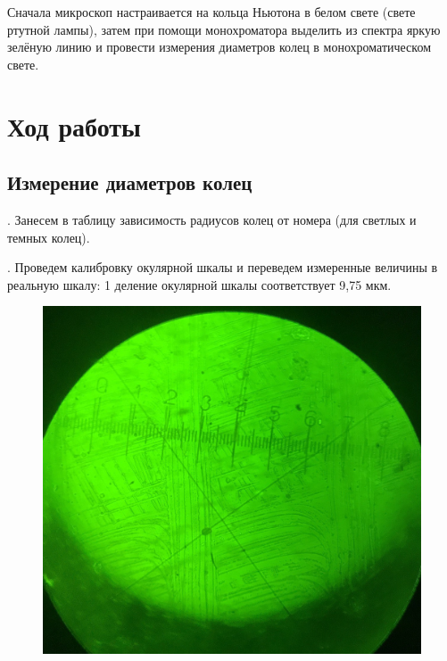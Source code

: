 \documentclass[a4paper,12pt]{article} %
\begin{document}
\medskip

\noindent Сначала микроскоп настраивается на кольца Ньютона в белом свете (свете ртутной лампы), затем при помощи монохроматора выделить из спектра яркую зелёную линию и провести измерения диаметров колец в монохроматическом свете. 
	

\section{Ход работы}

\subsection{Измерение диаметров колец}

. Занесем в таблицу зависимость радиусов колец от номера (для светлых и темных колец).

\medskip 
 

. Проведем калибровку окулярной шкалы и переведем измеренные величины в реальную шкалу: 1 деление окулярной шкалы соответствует 9,75 мкм.


\begin{figure}[h!]
 	\centering 	\includegraphics[width=0.25\linewidth]{линейка.png}
 \end{figure}
\end{document}
